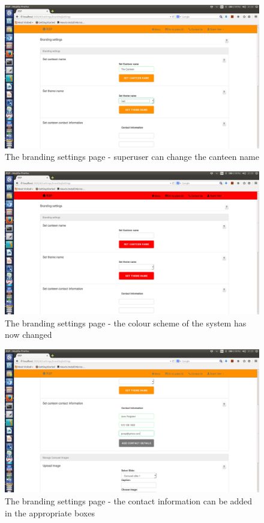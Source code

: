 \documentclass[a4paper,12pt]{report}
\begin{document}
\begin{figure}[H]
  \centering
    \includegraphics[width=1.0\textwidth]{screenshots/setTheme1.png}
    \caption{The branding settings page - superuser can change the canteen name}
\end{figure}

\begin{figure}[H]
  \centering
    \includegraphics[width=1.0\textwidth]{screenshots/setTheme2.png}
    \caption{The branding settings page - the colour scheme of the system has now changed}
\end{figure}

\begin{figure}[H]
  \centering
    \includegraphics[width=1.0\textwidth]{screenshots/addContactInfo.png}
    \caption{The branding settings page - the contact information can be added in the appropriate boxes}
\end{figure}
\end{document}
